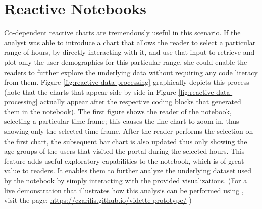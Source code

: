 \vspace*{-0.5cm}
\section{Reactive Notebooks} 
\vspace*{-0.2cm}
 Co-dependent reactive charts are tremendously useful in this scenario. If the analyst was able to introduce a chart that allows the reader to select a particular range of hours, by directly interacting with it, and use that input to retrieve and plot only the user demographics for this particular range, she could enable the readers to further explore the underlying data without requiring any code literacy from them. Figure \ref{fig:reactive-data-processing} graphically depicts this process (note that the charts that appear side-by-side in Figure \ref{fig:reactive-data-processing} actually appear after the respective coding blocks that generated them in the notebook). The first figure shows the reader of the notebook, selecting a particular time frame; this causes the line chart to zoom in, thus showing only the selected time frame. After the reader performs the selection on the first chart, the subsequent bar chart is also updated thus only showing the age groups of the users that visited the portal during the selected hours. This feature adds useful exploratory capabilities to the notebook, which is of great value to readers. It enables them to further analyze the underlying dataset used by the notebook by simply interacting with the provided visualizations. (For a live demonstration that illustrates how this analysis can be performed using \projname, visit the page: \url{https://czarifis.github.io/vidette-prototype/} )


